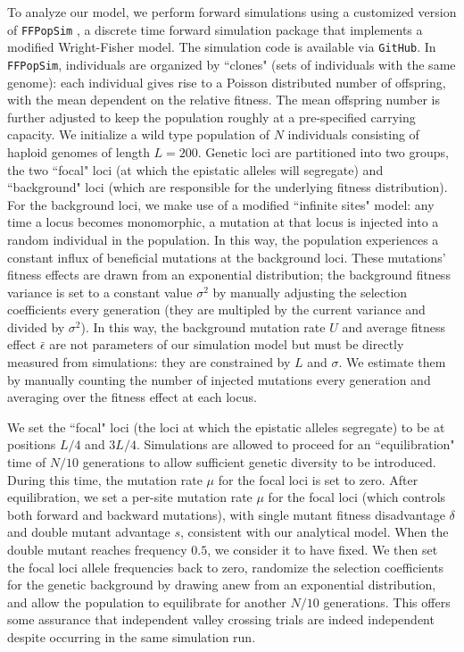 \documentclass[rmp]{revtex4}
\begin{document}
\begin{spacing}{1.5}
To analyze our model, we perform forward simulations using a customized version of \texttt{FFPopSim} \citep{zanini_2012}, a discrete time forward simulation package that implements a modified Wright-Fisher model.
The simulation code is available via \texttt{GitHub}.
In \texttt{FFPopSim}, individuals are organized by ``clones" (sets of individuals with the same genome): each individual gives rise to a Poisson distributed number of offspring, with the mean dependent on the relative fitness.
The mean offspring number is further adjusted to keep the population roughly at a pre-specified carrying capacity.
We initialize a wild type population of $N$ individuals consisting of haploid genomes of length $L = 200$.
Genetic loci are partitioned into two groups, the two ``focal" loci (at which the epistatic alleles will segregate) and ``background" loci (which are responsible for the underlying fitness distribution).
For the background loci, we make use of a modified ``infinite sites" model: any time a locus becomes monomorphic, a mutation at that locus is injected into a random individual in the population.
In this way, the population experiences a constant influx of beneficial mutations at the background loci.
These mutations' fitness effects are drawn from an exponential distribution; the background fitness variance is set to a constant value $\sigma^2$ by manually adjusting the selection coefficients every generation (they are multipled by the current variance and divided by $\sigma^2$).
In this way, the background mutation rate $U$ and average fitness effect $\bar{\epsilon}$ are not parameters of our simulation model but must be directly measured from simulations: they are constrained by $L$ and $\sigma$.
We estimate them by manually counting the number of injected mutations every generation and averaging over the fitness effect at each locus.

We set the ``focal" loci (the loci at which the epistatic alleles segregate) to be at positions $L/4$ and $3L/4$.
Simulations are allowed to proceed for an ``equilibration" time of $N/10$ generations to allow sufficient genetic diversity to be introduced.
During this time, the mutation rate $\mu$ for the focal loci is set to zero.
After equilibration, we set a per-site mutation rate $\mu$ for the focal loci (which controls both forward and backward mutations), with single mutant fitness disadvantage $\delta$ and double mutant advantage $s$, consistent with our analytical model.
When the double mutant reaches frequency $0.5$, we consider it to have fixed.
We then set the focal loci allele frequencies back to zero, randomize the selection coefficients for the genetic background by drawing anew from an exponential distribution, and allow the population to equilibrate for another $N/10$ generations.
This offers some assurance that independent valley crossing trials are indeed independent despite occurring in the same simulation run.


\end{spacing}
\end{document}
